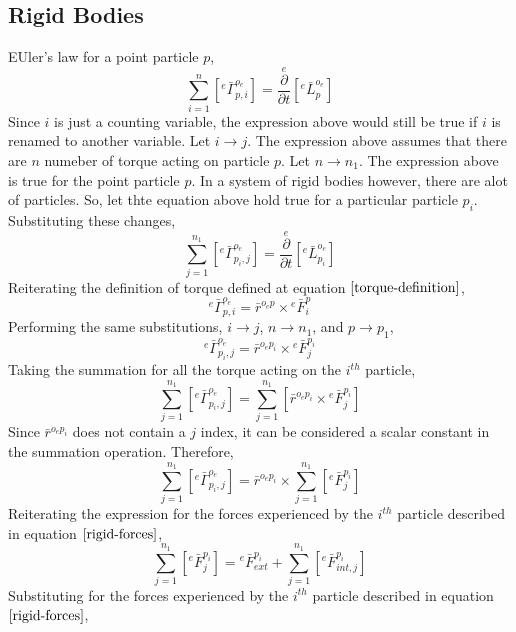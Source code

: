 \documentclass[class=report, 12pt, crop=false]{standalone}
\begin{document}
\begin{center}
\subsection{Rigid Bodies}
\begin{comment}
Kind of incomplete, more information about the colinear argument need to be made
\end{comment}
EUler's law for a point particle $p$,
$$\sum^{n}_{i = 1}\left[{}^{e}\bar{\Gamma}^{o_{e}}_{p,i}\right] = \overset{e}{\frac{\partial}{\partial t}}\left[{}^{e}\bar{L}^{o_{e}}_{p}\right]$$
Since $i$ is just a counting variable, the expression above would still be true if $i$ is renamed to another variable. Let $i \to j$. The expression above assumes that there are $n$ numeber of torque acting on particle $p$. Let $n \to n_{1}$. The expression above is true for the point particle $p$. In a system of rigid bodies however, there are alot of particles. So, let thte equation above hold true for a particular particle $p_{i}$. Substituting these changes,
\begin{equation}\sum^{n_{1}}_{j = 1}\left[{}^{e}\bar{\Gamma}^{o_{e}}_{p_{i},j}\right] = \overset{e}{\frac{\partial}{\partial t}}\left[{}^{e}\bar{L}^{o_{e}}_{p_{i}}\right]\label{moments-rigid-1}\end{equation}
Reiterating the definition of torque defined at equation $\ref{torque-definition}$,
$${}^{e}\bar{\Gamma}^{o_{e}}_{p,i} = \bar{r}^{o_{e}p}\times{}^{e}\bar{F}^{p}_{i}$$
Performing the same substitutions, $i \to j$, $n \to n_{1}$, and $p \to p_{1}$,
$${}^{e}\bar{\Gamma}^{o_{e}}_{p_{i},j} = \bar{r}^{o_{e}p_{i}}\times{}^{e}\bar{F}^{p_{i}}_{j}$$
Taking the summation for all the torque acting on the $i^{th}$ particle,
$$\sum^{n_{1}}_{j = 1}\left[{}^{e}\bar{\Gamma}^{o_{e}}_{p_{i},j}\right] = \sum^{n_{1}}_{j = 1}\left[\bar{r}^{o_{e}p_{i}}\times{}^{e}\bar{F}^{p_{i}}_{j}\right]$$
Since $\bar{r}^{o_{e}p_{i}}$ does not contain a $j$ index, it can be considered a scalar constant in the summation operation. Therefore,
$$\sum^{n_{1}}_{j = 1}\left[{}^{e}\bar{\Gamma}^{o_{e}}_{p_{i},j}\right] = \bar{r}^{o_{e}p_{i}}\times\sum^{n_{1}}_{j = 1}\left[{}^{e}\bar{F}^{p_{i}}_{j}\right]$$
Reiterating the expression for the forces experienced by the $i^{th}$ particle described in equation $\ref{rigid-forces}$,
$$\sum^{n_{1}}_{j = 1}\left[{}^{e}\bar{F}^{p_{i}}_{j}\right] = {}^{e}\bar{F}^{p_{i}}_{ext} + \sum^{n_{1}}_{j = 1}\left[{}^{e}\bar{F}^{p_{i}}_{int,j}\right]\label{rigid-forces}$$
Substituting for the forces experienced by the $i^{th}$ particle described in equation $\ref{rigid-forces}$,

\end{center}
\end{document}
